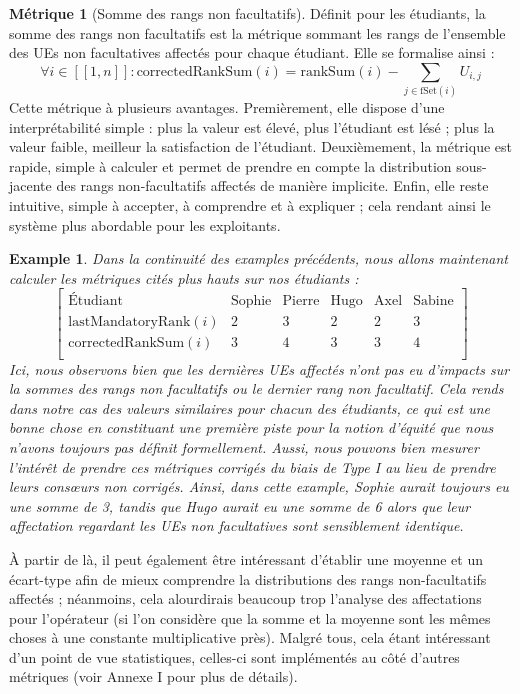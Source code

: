 \documentclass{rapport}
\theoremstyle{definition}
\theoremstyle{remark}
\theoremstyle{plain}
\newtheorem{example}{Example}
\theoremstyle{definition}
\newtheorem*{metric}{Métrique}
\theoremstyle{remark}
\newcommand{\llbracket}{[\![}
\newcommand{\rrbracket}{]\!]}
\begin{document}
\begin{metric}[Somme des rangs non facultatifs]
    Définit pour les étudiants, la somme des rangs non facultatifs est la métrique sommant les rangs de l'ensemble des UEs non facultatives affectés pour chaque étudiant.
    Elle se formalise ainsi :
    $$
        \forall i\in\llbracket 1, n\rrbracket : \text{correctedRankSum}(i) = \text{rankSum}(i)-\sum_{j\in\text{fSet}(i)} U_{i,j}
    $$
    Cette métrique à plusieurs avantages.
    Premièrement, elle dispose d'une interprétabilité simple : plus la valeur est élevé, plus l'étudiant est lésé ; plus la valeur faible, meilleur la satisfaction de l'étudiant.
    Deuxièmement, la métrique est rapide, simple à calculer et permet de prendre en compte la distribution sous-jacente des rangs non-facultatifs affectés de manière implicite.
    Enfin, elle reste intuitive, simple à accepter, à comprendre et à expliquer ; cela rendant ainsi le système plus abordable pour les exploitants.
\end{metric}

\begin{example}\label{ex:running3}
    Dans la continuité des examples précédents, nous allons maintenant calculer les métriques cités plus hauts sur nos étudiants :
    $$
    \begin{bmatrix}
        \text{Étudiant} & \text{Sophie} & \text{Pierre} & \text{Hugo} & \text{Axel} & \text{Sabine}\\
        \text{lastMandatoryRank}(i) & 2 & 3 & 2 & 2 & 3\\
        \text{correctedRankSum}(i) & 3 & 4 & 3 & 3 & 4\\
    \end{bmatrix}
    $$
    Ici, nous observons bien que les dernières UEs affectés n'ont pas eu d'impacts sur la sommes des rangs non facultatifs ou le dernier rang non facultatif. Cela rends dans notre cas des valeurs similaires pour chacun des étudiants, ce qui est une bonne chose en constituant une première piste pour la notion d'équité que nous n'avons toujours pas définit formellement.
    Aussi, nous pouvons bien mesurer l'intérêt de prendre ces métriques corrigés du biais de Type I au lieu de prendre leurs consœurs non corrigés. Ainsi, dans cette example, Sophie aurait toujours eu une somme de 3, tandis que Hugo aurait eu une somme de 6 alors que leur affectation regardant les UEs non facultatives sont sensiblement identique.
\end{example}

À partir de là, il peut également être intéressant d'établir une moyenne et un écart-type afin de mieux comprendre la distributions des rangs non-facultatifs affectés ; néanmoins, cela alourdirais beaucoup trop l'analyse des affectations pour l'opérateur (si l'on considère que la somme et la moyenne sont les mêmes choses à une constante multiplicative près). Malgré tous, cela étant intéressant d'un point de vue statistiques, celles-ci sont implémentés au côté d'autres métriques (voir Annexe I pour plus de détails).
\end{document}
